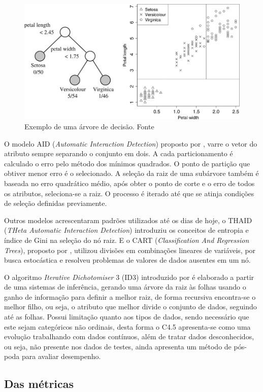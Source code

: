\documentclass{article}
\begin{document}
\begin{figure}[ht]
\centering
\includegraphics[width=.5\textwidth]{fig1.png}
\caption{Exemplo de uma árvore de decisão. Fonte \cite{Loh_2014}}
\label{Fig1}
\end{figure}

O modelo AID (\emph{Automatic Interaction Detection}) proposto por \cite{Morgan_1963}, varre o vetor do atributo sempre separando o conjunto em dois. A cada particionamento é calculado o erro pelo método dos mínimos quadrados. O ponto de partição que obtiver menor erro é o selecionado. A seleção da raiz de uma subárvore também é baseada no erro quadrático médio, após obter o ponto de corte e o erro de todos os atributos, seleciona-se a raiz. O processo é iterado até que se atinja condições de seleção definidas previamente.

Outros modelos acrescentaram padrões utilizados até os dias de hoje, o THAID (\emph{THeta Automatic Interaction Detection}) \cite{Messenger1972} introduziu os conceitos de entropia e índice de Gini na seleção do nó raiz. E o CART (\emph{Classification And Regression Trees}), proposto por \cite{Breiman1984}, utilizou divisões em combinações lineares de variáveis, por busca estocástica e resolveu problemas de valores de dados ausentes em um nó.

O algoritmo  \textit{Iterative Dichotomiser} 3 (ID3) introduzido  por  \cite{quinlan1986} é elaborado a partir de uma sistemas de inferência, gerando uma árvore da raiz às folhas usando o ganho de informação para definir a melhor raiz, de forma recursiva encontra-se o melhor filho, ou seja, o atributo que melhor divide o conjunto de dados, seguindo até as folhas. Possui limitação quanto aos tipos de dados, sendo necessário que este sejam categóricos não ordinais, desta forma o C4.5 apresenta-se como uma evolução trabalhando com dados contínuos, além de tratar dados desconhecidos, ou seja, não presente nos dados de testes, ainda apresenta um método de pós-poda para avaliar desempenho.

\subsection{Das métricas}
\end{document}

